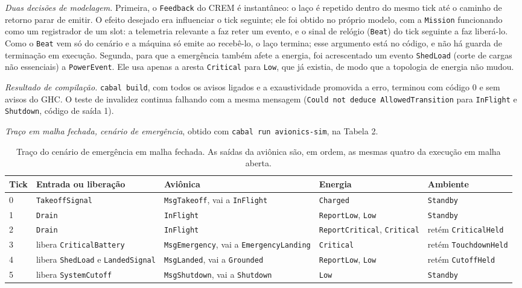 \documentclass[12pt,a4paper]{article}
\begin{document}
\textit{Duas decisões de modelagem.} Primeira, o \texttt{Feedback} do CREM é instantâneo: o laço é repetido dentro do mesmo tick até o caminho de retorno parar de emitir. O efeito desejado era influenciar o tick seguinte; ele foi obtido no próprio modelo, com a \texttt{Mission} funcionando como um registrador de um slot: a telemetria relevante a faz reter um evento, e o sinal de relógio (\texttt{Beat}) do tick seguinte a faz liberá-lo. Como o \texttt{Beat} vem só do cenário e a máquina só emite ao recebê-lo, o laço termina; esse argumento está no código, e não há guarda de terminação em execução. Segunda, para que a emergência também afete a energia, foi acrescentado um evento \texttt{ShedLoad} (corte de cargas não essenciais) a \texttt{PowerEvent}. Ele usa apenas a aresta \texttt{Critical} para \texttt{Low}, que já existia, de modo que a topologia de energia não mudou.

\textit{Resultado de compilação.} \texttt{cabal build}, com todos os avisos ligados e a exaustividade promovida a erro, terminou com código 0 e sem avisos do GHC. O teste de invalidez continua falhando com a mesma mensagem (\texttt{Could not deduce AllowedTransition} para \texttt{InFlight} e \texttt{Shutdown}, código de saída 1).

\textit{Traço em malha fechada, cenário de emergência}, obtido com \texttt{cabal run avionics-sim}, na Tabela 2.

\begin{table}[h]
\centering
\scriptsize
\begin{tabular}{|p{0.7cm}|p{3.1cm}|p{4.3cm}|p{3.0cm}|p{2.9cm}|}
\hline
Tick & Entrada ou liberação & Aviônica & Energia & Ambiente \\
\hline
0 & \texttt{TakeoffSignal} & \texttt{MsgTakeoff}, vai a \texttt{InFlight} & \texttt{Charged} & \texttt{Standby} \\
\hline
1 & \texttt{Drain} & \texttt{InFlight} & \texttt{ReportLow}, \texttt{Low} & \texttt{Standby} \\
\hline
2 & \texttt{Drain} & \texttt{InFlight} & \texttt{ReportCritical}, \texttt{Critical} & retém \texttt{CriticalHeld} \\
\hline
3 & libera \texttt{CriticalBattery} & \texttt{MsgEmergency}, vai a \texttt{EmergencyLanding} & \texttt{Critical} & retém \texttt{TouchdownHeld} \\
\hline
4 & libera \texttt{ShedLoad} e \texttt{LandedSignal} & \texttt{MsgLanded}, vai a \texttt{Grounded} & \texttt{ReportLow}, \texttt{Low} & retém \texttt{CutoffHeld} \\
\hline
5 & libera \texttt{SystemCutoff} & \texttt{MsgShutdown}, vai a \texttt{Shutdown} & \texttt{Low} & \texttt{Standby} \\
\hline
\end{tabular}
\caption{Traço do cenário de emergência em malha fechada. As saídas da aviônica são, em ordem, as mesmas quatro da execução em malha aberta.}
\end{table}
\end{document}
